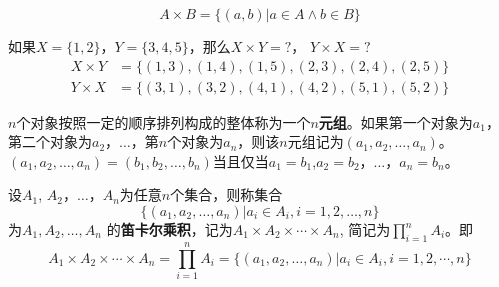 \documentclass{beamer}
\begin{document}
\begin{CJK*}{UTF8}{gbsn}
\begin{frame}
\begin{Def}
\begin{equation*}
  A \times B = \{(a,b)|a \in A \land b \in B\}
\end{equation*}
  \end{Def}
  \begin{Ex}
    如果$X=\{1,2\}$，$Y=\{3,4,5\}$，那么$X \times Y = ?$， $Y \times X = ?$
    \begin{equation*}
      \begin{split}
       X \times Y &= \{ (1,3), (1,4), (1,5), (2,3), (2,4), (2, 5) \}\\
       Y \times X &= \{(3,1), (3,2), (4,1), (4,2), (5,1), (5,2)\}
      \end{split}
    \end{equation*}
  \end{Ex}
\end{frame}
\begin{frame}
    \begin{Def}
    $n$个对象按照一定的顺序排列构成的整体称为一个{\bfseries $n$元组}。如果第一个对象为$a_1$，第二个对象为$a_2$，$\ldots$，第$n$个对象为$a_n$，则该$n$元组记为$(a_1,a_2, \ldots, a_n)$。
 $(a_1,a_2, \ldots, a_n)=(b_1,b_2, \ldots, b_n)$当且仅当$a_1=b_1$,$a_2=b_2$，$\ldots$，$a_n=b_n$。
  \end{Def}
  \begin{Def}
    设$A_1$, $A_2$，$\ldots$，$A_n$为任意$n$个集合，则称集合 \[\{(a_1,a_2, \ldots, a_n)|a_i\in A_i, i = 1,2,\ldots, n\}\] 为$A_1, A_2, \ldots, A_n$ 的{\bfseries 笛卡尔乘积}，记为$A_1 \times A_2 \times \cdots \times A_n$, 简记为$\prod_{i=1}^nA_i$。即
\begin{equation*}
  A_1 \times A_2 \times \cdots \times A_n = \prod_{i=1}^nA_i = \{(a_1,a_2, \ldots, a_n)|a_i \in A_i, i = 1, 2, \cdots, n\}
\end{equation*}


\end{Def}
\end{frame}
\end{CJK*}
\end{document}
